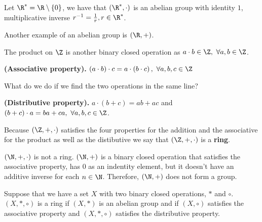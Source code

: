 \begin{example}
    Let $\R^* = \R\setminus \{0\} $, we have that $\left( \R^*, \cdot \right) $ is an abelian group with identity $1$, multiplicative inverse $r^{-1} = \frac{1}{r}, r\in\R^*$.

    Another example of an abelian group is $\left( \R, + \right) $.
\end{example}

The product on $\Z$ is another binary closed operation as $a\cdot b\in\Z,\ \forall a, b\in\Z$.

\begin{proposition}
    \textbf{(Associative property).} $\left( a \cdot b \right) \cdot c = a \cdot \left( b \cdot c \right) ,\ \forall a, b, c\in\Z$
\end{proposition}

What do we do if we find the two operations in the same line?

\begin{proposition}
    \textbf{(Distributive property).} $a\cdot\left( b + c \right) = ab + ac$ and $\left( b + c \right)\cdot a = ba + ca,\ \forall a, b, c\in\Z $.
\end{proposition}

Because $\left( \Z, +, \cdot \right) $ satisfies the four properties for the addition and the associative for the product as well as the distibutive we say that $\left( \Z, +, \cdot \right) $ is a \textbf{ring}.

\begin{example}
    $\left( \N, +, \cdot \right) $ is not a ring. $\left( \N, + \right) $ is a binary closed operation that satisfies the associative property, has $0$ as an indentity element, but it doesn't have an additive inverse for each $n\in\N$. Therefore, $\left( \N, + \right) $ does not form a group.
\end{example}

Suppose that we have a set $X$ with two binary closed operations, $*$ and $\circ$. $\left(X, *, \circ  \right) $ is a ring if $\left( X, * \right) $ is an abelian group and if $\left( X, \circ \right) $ satisfies the associative property and $\left( X, *, \circ \right) $ satisfies the distributive property.

